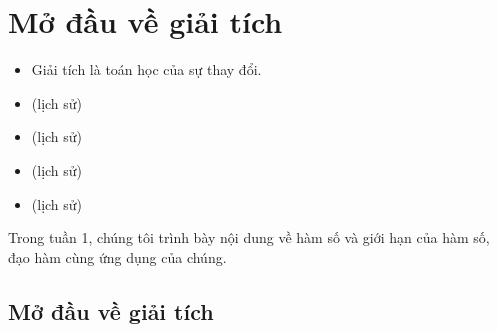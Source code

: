 \documentclass[a4paper,12pt]{book}
\begin{document}
\chapter{Mở đầu về giải tích}


\begin{itemize}
    \item Giải tích là toán học của sự thay đổi.

    \item (lịch sử)

    \item (lịch sử)

    \item (lịch sử)
    \item (lịch sử)

\end{itemize}
\noindent Trong tuần 1, chúng tôi trình bày nội dung về hàm số và giới hạn của hàm số, đạo hàm cùng ứng dụng của chúng.
\newpage
\section{Mở đầu về giải tích}
\end{document}

